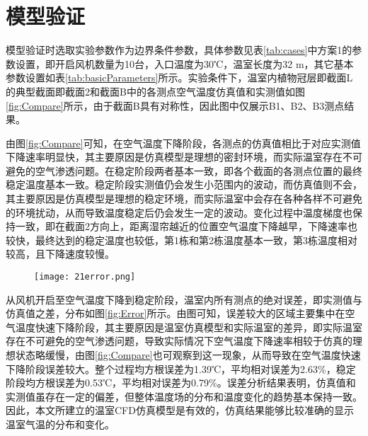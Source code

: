 \section{模型验证}
模型验证时选取实验参数作为边界条件参数，具体参数见表\ref{tab:cases}中方案1的参数设置，即开启风机数量为10台，入口温度为30℃，温室长度为32 m，其它基本参数设置如表\ref{tab:basicParameters}所示。实验条件下，温室内植物冠层即截面L的典型截面即截面2和截面B中的各测点空气温度仿真值和实测值如图\ref{fig:Compare}所示，由于截面B具有对称性，因此图中仅展示B1、B2、B3测点结果。

	\begin{figure}[!htbp]
		\centering
 	\end{figure}
由图\ref{fig:Compare}可知，在空气温度下降阶段，各测点的仿真值相比于对应实测值下降速率明显快，其主要原因是仿真模型是理想的密封环境，而实际温室存在不可避免的空气渗透问题。在稳定阶段两者基本一致，即各个截面的各测点位置的最终稳定温度基本一致。稳定阶段实测值仍会发生小范围内的波动，而仿真值则不会，其主要原因是仿真模型是理想的稳定环境，而实际温室中会存在各种各样不可避免的环境扰动，从而导致温度稳定后仍会发生一定的波动。变化过程中温度梯度也保持一致，即在截面2方向上，距离湿帘越近的位置空气温度下降越早，下降速率也较快，最终达到的稳定温度也较低，第1栋和第2栋温度基本一致，第3栋温度相对较高，且下降速度较慢。

	\begin{figure}[!htbp]
		\centering
		\texttt{[image: 21error.png]}
	\end{figure}
从风机开启至空气温度下降到稳定阶段，温室内所有测点的绝对误差，即实测值与仿真值之差，分布如图\ref{fig:Error}所示。由图可知，误差较大的区域主要集中在空气温度快速下降阶段，其主要原因是温室仿真模型和实际温室的差异，即实际温室存在不可避免的空气渗透问题，导致实际情况下空气温度下降速率相较于仿真的理想状态略缓慢，由图\ref{fig:Compare}也可观察到这一现象，从而导致在空气温度快速下降阶段误差较大。整个过程均方根误差为1.39℃，平均相对误差为2.63\%，稳定阶段均方根误差为0.53℃，平均相对误差为0.79\%。误差分析结果表明，仿真值和实测值虽存在一定的偏差，但整体温度场的分布和温度变化的趋势基本保持一致。因此，本文所建立的温室CFD仿真模型是有效的，仿真结果能够比较准确的显示温室气温的分布和变化。

